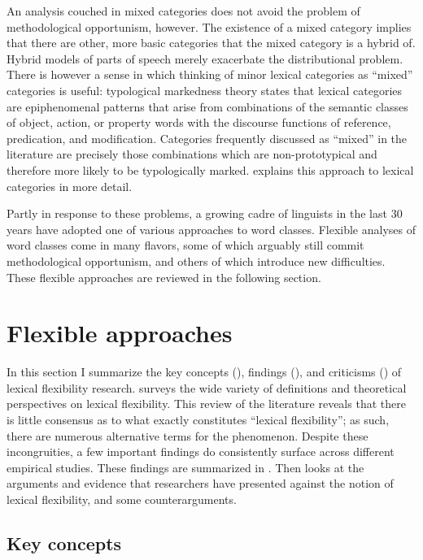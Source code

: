 An analysis couched in mixed categories does not avoid the problem of methodological opportunism, however. The existence of a mixed category implies that there are other, more basic categories that the mixed category is a hybrid of. Hybrid models of parts of speech merely exacerbate the distributional problem. There is however a sense in which thinking of minor lexical categories as \enquote{mixed} categories is useful: typological markedness theory states that lexical categories are epiphenomenal patterns that arise from combinations of the semantic classes of object, action, or property words with the discourse functions of reference, predication, and modification. Categories frequently discussed as \enquote{mixed} in the literature are precisely those combinations which are non-prototypical and therefore more likely to be typologically marked.  explains this approach to lexical categories in more detail.

Partly in response to these problems, a growing cadre of linguists in the last 30 years have adopted one of various  approaches to word classes. Flexible analyses of word classes come in many flavors, some of which arguably still commit methodological opportunism, and others of which introduce new difficulties. These flexible approaches are reviewed in the following section.

\section{Flexible approaches}
\label{sec:2.3}

In this section I summarize the key concepts (), findings (), and criticisms () of lexical flexibility research.  surveys the wide variety of definitions and theoretical perspectives on lexical flexibility. This review of the literature reveals that there is little consensus as to what exactly constitutes \enquote{lexical flexibility}; as such, there are numerous alternative terms for the phenomenon. Despite these incongruities, a few important findings do consistently surface across different empirical studies. These findings are summarized in . Then  looks at the arguments and evidence that researchers have presented against the notion of lexical flexibility, and some counterarguments.

\subsection{Key concepts}
\label{sec:2.3.1}

